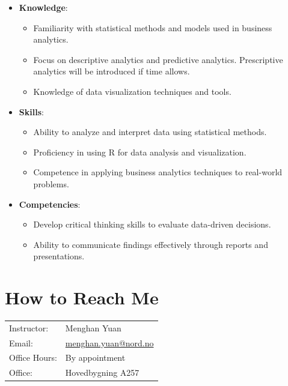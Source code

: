 \documentclass[
  12pt,
  a4paper,
]{scrbook}
\providecommand{\tightlist}{%
  \setlength{\itemsep}{0pt}\setlength{\parskip}{0pt}}
\renewcommand{\tightlist}{\setlength{\itemsep}{0.5\baselineskip}\setlength{\parskip}{0.2\baselineskip}}
\theoremstyle{plain}
\theoremstyle{definition}
\theoremstyle{remark}
\begin{document}
\begin{itemize}
\tightlist
\item
  \textbf{Knowledge}:

  \begin{itemize}
  \tightlist
  \item
    Familiarity with statistical methods and models used in business
    analytics.
  \item
    Focus on descriptive analytics and predictive analytics.
    Prescriptive analytics will be introduced if time allows.
  \item
    Knowledge of data visualization techniques and tools.
  \end{itemize}
\item
  \textbf{Skills}:

  \begin{itemize}
  \tightlist
  \item
    Ability to analyze and interpret data using statistical methods.
  \item
    Proficiency in using R for data analysis and visualization.
  \item
    Competence in applying business analytics techniques to real-world
    problems.
  \end{itemize}
\item
  \textbf{Competencies}:

  \begin{itemize}
  \tightlist
  \item
    Develop critical thinking skills to evaluate data-driven decisions.
  \item
    Ability to communicate findings effectively through reports and
    presentations.
  \end{itemize}
\end{itemize}

\section{How to Reach Me}\label{how-to-reach-me}

\begin{tabular}{@{}ll@{}}
Instructor:    & Menghan Yuan \\[2pt]
Email:         & \href{mailto:menghan.yuan@nord.no}{menghan.yuan@nord.no} \\[2pt]
Office Hours:  & By appointment \\[2pt]
Office:        & Hovedbygning A257 \\
\end{tabular}
\end{document}
